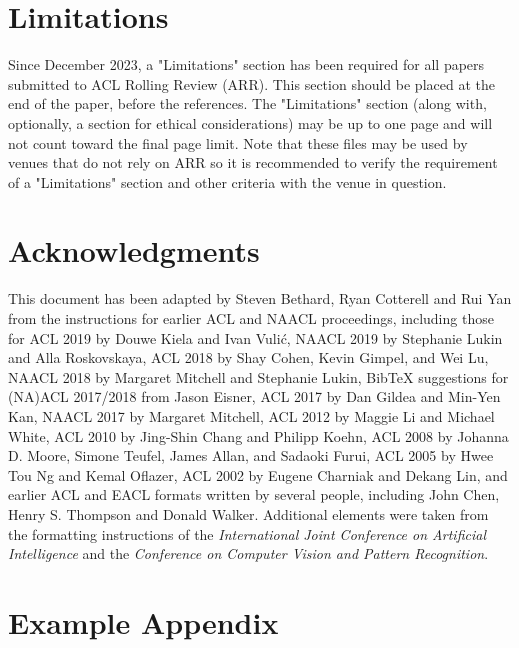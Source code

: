 \documentclass[11pt]{article}
\begin{document}
\section*{Limitations}

Since December 2023, a "Limitations" section has been required for all papers submitted to ACL Rolling Review (ARR). This section should be placed at the end of the paper, before the references. The "Limitations" section (along with, optionally, a section for ethical considerations) may be up to one page and will not count toward the final page limit. Note that these files may be used by venues that do not rely on ARR so it is recommended to verify the requirement of a "Limitations" section and other criteria with the venue in question.

\section*{Acknowledgments}

This document has been adapted
by Steven Bethard, Ryan Cotterell and Rui Yan
from the instructions for earlier ACL and NAACL proceedings, including those for
ACL 2019 by Douwe Kiela and Ivan Vuli\'{c},
NAACL 2019 by Stephanie Lukin and Alla Roskovskaya,
ACL 2018 by Shay Cohen, Kevin Gimpel, and Wei Lu,
NAACL 2018 by Margaret Mitchell and Stephanie Lukin,
Bib\TeX{} suggestions for (NA)ACL 2017/2018 from Jason Eisner,
ACL 2017 by Dan Gildea and Min-Yen Kan,
NAACL 2017 by Margaret Mitchell,
ACL 2012 by Maggie Li and Michael White,
ACL 2010 by Jing-Shin Chang and Philipp Koehn,
ACL 2008 by Johanna D. Moore, Simone Teufel, James Allan, and Sadaoki Furui,
ACL 2005 by Hwee Tou Ng and Kemal Oflazer,
ACL 2002 by Eugene Charniak and Dekang Lin,
and earlier ACL and EACL formats written by several people, including
John Chen, Henry S. Thompson and Donald Walker.
Additional elements were taken from the formatting instructions of the \emph{International Joint Conference on Artificial Intelligence} and the \emph{Conference on Computer Vision and Pattern Recognition}.
\fi
%


\appendix

\iffalse
\section{Example Appendix}
\label{sec:appendix}
\end{document}
